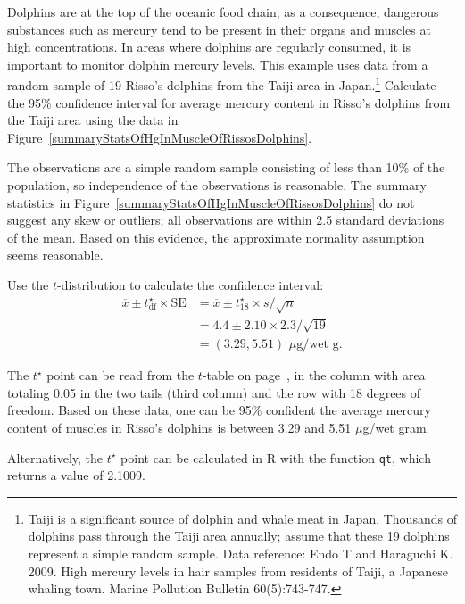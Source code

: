 \begin{examplewrap}
\begin{nexample}{Dolphins are at the top of the oceanic food chain; as a consequence, dangerous substances such as mercury tend to be present in their organs and muscles at high concentrations. In areas where dolphins are regularly consumed, it is important to monitor dolphin mercury levels. This example uses data from a random sample of 19 Risso's dolphins from the Taiji area in Japan.\footnote{Taiji is a significant source of dolphin and whale meat in Japan. Thousands of dolphins pass through the Taiji area annually; assume that these 19 dolphins represent a simple random sample. Data reference: Endo T and Haraguchi K. 2009. High mercury levels in hair samples from residents of Taiji, a Japanese whaling town. Marine Pollution Bulletin 60(5):743-747.} Calculate the 95\% confidence interval for average mercury content in Risso's dolphins from the Taiji area using the data in Figure~\ref{summaryStatsOfHgInMuscleOfRissosDolphins}.}

The observations are a simple random sample consisting of less than 10\% of the population, so independence of the observations is reasonable. The summary statistics in Figure~\ref{summaryStatsOfHgInMuscleOfRissosDolphins} do not suggest any skew or outliers; all observations are within 2.5 standard deviations of the mean. Based on this evidence, the approximate normality assumption seems reasonable.

Use the $t$-distribution to calculate the confidence interval:
\begin{align*}
\overline{x} \pm  t^{\star}_{\text{df}} \times \text{SE} &= \overline{x}  \pm  t^{\star}_{18}  \times s/\sqrt{n} \\
&= 4.4 \pm  2.10 \times 2.3/\sqrt{19} \\
&= (3.29, 5.51)\,\, \mu\text{g/wet g}.
\end{align*}

The $t^{\star}$ point can be read from the $t$-table on page~\pageref{tTableSample}, in the column with area totaling 0.05 in the two tails (third column) and the row with 18 degrees of freedom. Based on these data, one can be 95\% confident the average mercury content of muscles in Risso's dolphins is between 3.29 and 5.51 $\mu$g/wet gram.

Alternatively, the $t^\star$ point can be calculated in \textsf{R} with the function \texttt{qt}, which returns a value of 2.1009.
\end{nexample}
\end{examplewrap}

